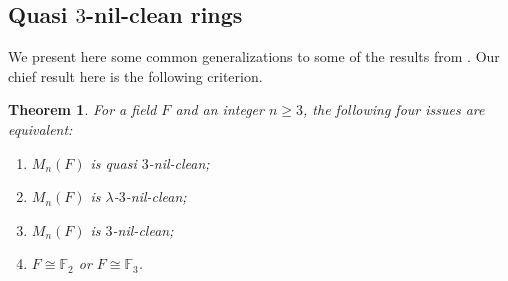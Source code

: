 \documentclass{amsart}
\newtheorem{theorem}{Theorem}[section]
\theoremstyle{definition}
\theoremstyle{remark}
\numberwithin{equation}{section}
\begin{document}
\subsection{Quasi $3$-nil-clean rings}

We present here some common generalizations to some of the results from \cite{Su}. Our chief result here is the following criterion.

\begin{theorem}\label{lambda-3-N}
For a field $F$ and an integer $n \geq 3$, the following four issues are equivalent:
\begin{enumerate}
\item $M_{n}(F)$ is quasi $3$-nil-clean;
\item $M_{n}(F)$ is $\lambda$-$3$-nil-clean;
\item $M_{n}(F)$ is $3$-nil-clean;
\item $F \cong \mathbb{F}_{2}$ or $F \cong \mathbb{F}_{3}$.
\end{enumerate}
\end{theorem}
\end{document}
